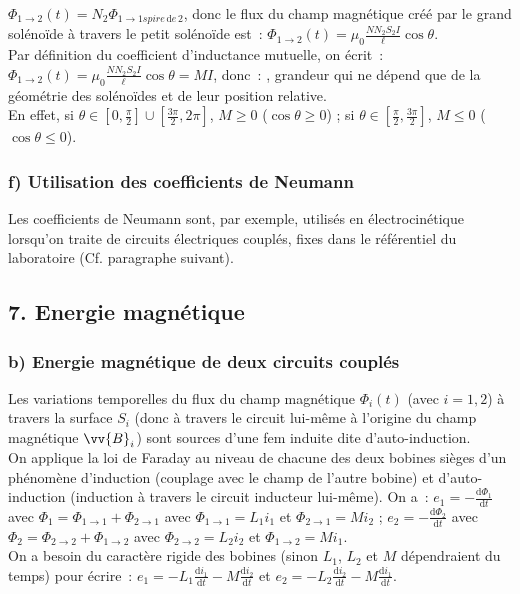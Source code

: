 \documentclass{article}
\renewcommand\overrightarrow{\vv}
\begin{document}
\begin{itemize}
$\Phi_{1\longrightarrow 2}\left(t\right) = N_{2}\Phi_{1\longrightarrow 1
spire\, \mathrm{d}e\,2}$, donc le flux du champ magnétique créé par le grand
solénoïde à travers le petit solénoïde est : $\Phi_{1\longrightarrow 2}\left(t\right) = \mu_{0}\frac{NN_{2}S_{2}I}{\ell}\cos\theta$.\\
Par définition du coefficient d'inductance mutuelle, on écrit :
$\Phi_{1\longrightarrow 2}\left(t\right)
=\mu_{0}\frac{NN_{2}S_{2}I}{\ell}\cos\theta = MI$, donc : , grandeur qui ne dépend
que de la géométrie des solénoïdes et de leur position
relative. \\
En effet, si $\theta \in \left[0,\frac{\pi}{2}\right] \cup
\left[\frac{3\pi}{2},2\pi\right]$, $M\geq 0$ ($\cos\theta \geq 0$) ; si $\theta
\in \left[\frac{\pi}{2},\frac{3\pi}{2}\right]$, $M\leq 0$ ($\cos\theta \leq
0$).
\end{itemize}

\subsubsection*{f) Utilisation des coefficients de Neumann}
Les coefficients de Neumann sont, par exemple, utilisés en
électrocinétique lorsqu'on traite de circuits électriques couplés,
fixes dans le référentiel du laboratoire (Cf. paragraphe suivant).

\subsection*{7. Energie magnétique}
\subsubsection*{b) Energie magnétique de deux circuits couplés}
Les variations temporelles du flux du champ magnétique
$\Phi_{i}\left(t\right)$ (avec $i=1,2$) à travers la surface $S_{i}$ (donc à
travers le circuit lui-même à l'origine du champ magnétique
$\overrightarrow{B}_{i}$) sont sources d'une fem induite dite
d'auto-induction. \\
On applique la loi de Faraday au niveau de chacune des deux bobines
sièges d'un phénomène d'induction (couplage avec le champ de l'autre
bobine) et d'auto-induction (induction à travers le circuit
inducteur lui-même). On a : $e_{1} = -\frac{\mathrm{d}\Phi_{1}}{\mathrm{d}t}$ avec
$\Phi_{1} = \Phi_{1 \rightarrow 1}+ \Phi_{2 \rightarrow 1}$ avec
$\Phi_{1 \rightarrow 1} = L_{1}i_{1}$ et $\Phi_{2 \rightarrow 1} =
Mi_{2}$ ; $e_{2} = -\frac{\mathrm{d}\Phi_{2}}{\mathrm{d}t}$ avec $\Phi_{2} = \Phi_{2
\rightarrow 2}+ \Phi_{1 \rightarrow 2}$ avec $\Phi_{2 \rightarrow 2}
= L_{2}i_{2}$ et $\Phi_{1 \rightarrow 2} = Mi_{1}$.
\\
On a besoin du caractère rigide des bobines (sinon $L_{1}$, $L_{2}$
et $M$ dépendraient du temps) pour écrire : $e_{1} =
-L_{1}\frac{\mathrm{d}i_{1}}{\mathrm{d}t}-M\frac{\mathrm{d}i_{2}}{\mathrm{d}t}$ et $e_{2} =
-L_{2}\frac{\mathrm{d}i_{2}}{\mathrm{d}t}-M\frac{\mathrm{d}i_{1}}{\mathrm{d}t}$. \\
\end{document}

